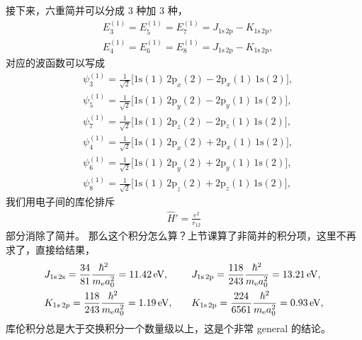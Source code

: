 接下来，六重简并可以分成 3 种加 3 种，
\begin{align}
&E_3^{(1)} = E_5^{(1)} = E_7^{(1)} = J_{\mathrm{1s\,2p}} - K_{\mathrm{1s\,2p}}, \\
&E_4^{(1)} = E_6^{(1)} = E_8^{(1)} = J_{\mathrm{1s\,2p}} - K_{\mathrm{1s\,2p}}, 
\end{align}
对应的波函数可以写成 %
\begin{align}
    & \psi_3^{(1)} = \frac1{\sqrt 2} \big[
    \mathrm{1s(1)\,2p}_x(2) - \mathrm{2p}_x(1)\,\mathrm{1s}(2) 
    \big], \\
    & \psi_5^{(1)} = \frac1{\sqrt 2} \big[
    \mathrm{1s(1)\,2p}_y(2) - \mathrm{2p}_y(1)\,\mathrm{1s}(2) 
    \big], \\
    & \psi_7^{(1)} = \frac1{\sqrt 2} \big[
    \mathrm{1s(1)\,2p}_z(2) - \mathrm{2p}_z(1)\,\mathrm{1s}(2) 
    \big], 
\end{align}
\begin{align}
    & \psi_4^{(1)} = \frac1{\sqrt 2} \big[
    \mathrm{1s(1)\,2p}_x(2) + \mathrm{2p}_x(1)\,\mathrm{1s}(2) 
    \big], \\
    & \psi_6^{(1)} = \frac1{\sqrt 2} \big[
    \mathrm{1s(1)\,2p}_y(2) + \mathrm{2p}_y(1)\,\mathrm{1s}(2) 
    \big], \\
    & \psi_8^{(1)} = \frac1{\sqrt 2} \big[
    \mathrm{1s(1)\,2p}_z(2) + \mathrm{2p}_z(1)\,\mathrm{1s}(2) 
    \big], 
\end{align}
我们用电子间的库伦排斥
\begin{align}
    \hat H' = \frac{e^2}{r_{12}}
\end{align}
部分消除了简并。
那么这个积分怎么算？上节课算了非简并的积分项，这里不再求了，直接给结果，
\begin{alignat}{2}
    &J_{\text{1s\,2s}} = \frac{34}{81} \frac{\hbar^2}{m_{\mathrm e}a_0^2} = \SI{11.42}{\electronvolt}, \quad
    &&J_{\text{1s\,2p}} = \frac{118}{243} \frac{\hbar^2}{m_{\mathrm e}a_0^2} = \SI{13.21}{\electronvolt},\\
    &K_{1s\,2p} = \frac{118}{243} \frac{\hbar^2}{m_{\mathrm e}a_0^2} = \SI{1.19}{\electronvolt}, \quad
    &&K_{\text{1s\,2p}} = \frac{224}{6561} \frac{\hbar^2}{m_{\mathrm e}a_0^2} = \SI{0.93}{\electronvolt},
\end{alignat}
库伦积分总是大于交换积分一个数量级以上，这是个非常 general 的结论。


